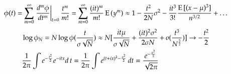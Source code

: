 \documentclass[main.tex]{subfiles}
\begin{document}
\[\phi(t)=\sum_{m=0}^{\infty}\left.\frac{d^m\phi}{dt^m}\right|_{t=0}\frac{t^m}{m!}=\sum_{m=0}^{\infty}\frac{(it)^m}{m!}\operatorname{E}{(y^m)}\approx1-\frac{t^2}{2N}\sigma^2-\frac{it^3}{3!}\frac{\operatorname{E}{[(x-\mu)^3]}}{n^{3/2}}+\ldots\]
\begin{align*}
&\log{\phi_N}=N\log{\phi(\frac{t}{\sigma\sqrt{N}})}\approx N[\frac{it\mu}{\sigma\sqrt{N}}+\frac{(it)^2\sigma^2}{2\sigma N}+o(\frac{t^3}{N^{\frac{3}{2}}})]\to-\frac{t^2}{2}\\
&\frac{1}{2\pi}\int e^{-\frac{t^2}{2}}e^{-itx}d\,t=\frac{1}{2\pi}\int e^{(t+ix)^2-\frac{x^2}{2}}\,dt=\frac{e^{-\frac{x^2}{2}}}{\sqrt{2\pi}}
\end{align*}
\end{document}
